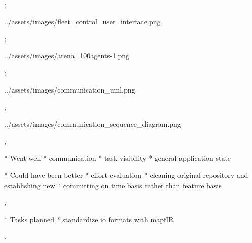 \pg;


\centerline{\picw=16cm \inspic ../assets/images/fleet_control_user_interface.png }

\pg;



\centerline{\picw=14cm \inspic ../assets/images/arena_100agents-1.png }

\pg;



\centerline{\picw=16cm \inspic ../assets/images/communication_uml.png }

\pg;


\centerline{\picw=16cm \inspic ../assets/images/communication_sequence_diagram.png }

\pg;



* Went well
\typosize[14/14]
\begitems
* communication
* task visibility
* general application state
\enditems

* Could have been better
\typosize[14/14]
\begitems
* effort evaluation
* cleaning original repository and establishing new
* committing on time basis rather than feature basis
\enditems

\pg;



* Tasks planned
\typosize[14/14]
\begitems
* standardize io formats with mapfIR
\enditems

\pg.
